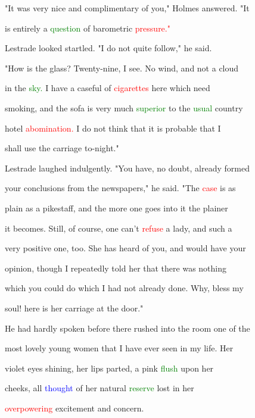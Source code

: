 "It was very nice and complimentary of you," Holmes answered. "It

 is entirely a \textcolor{green}{question} of barometric \textcolor{red}{pressure."}



 Lestrade looked \textcolor{BurntOrange}{startled.} "I do not quite follow," he said.



 "How is the glass? Twenty-nine, I see. No wind, and not a cloud

 in the \textcolor{green}{sky.} I have a caseful of \textcolor{red}{cigarettes} here which need

 smoking, and the sofa is very much \textcolor{green}{superior} to the \textcolor{green}{usual} country

 hotel \textcolor{red}{abomination.} I do not think that it is probable that I

 shall use the carriage to-night."



 Lestrade \textcolor{BurntOrange}{laughed} indulgently. "You have, no \textcolor{BurntOrange}{doubt,} already formed

 your conclusions from the newspapers," he said. "The \textcolor{red}{case} is as

 plain as a pikestaff, and the more one goes into it the plainer

 it becomes. Still, of course, one can't \textcolor{red}{refuse} a lady, and such a

 very positive one, too. She has heard of you, and would have your

 opinion, though I repeatedly told her that there was nothing

 which you could do which I had not already done. Why, \textcolor{BurntOrange}{bless} my

 soul! here is her carriage at the door."



 He had hardly spoken before there rushed into the room one of the

 most \textcolor{BurntOrange}{lovely} \textcolor{BurntOrange}{young} women that I have ever seen in my life. Her

 violet eyes shining, her lips parted, a pink \textcolor{green}{flush} upon her

 cheeks, all \textcolor{blue}{thought} of her natural \textcolor{green}{reserve} \textcolor{BurntOrange}{lost} in her

 \textcolor{red}{overpowering} \textcolor{BurntOrange}{excitement} and concern.



